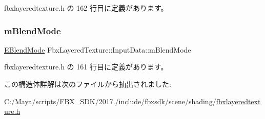  fbxlayeredtexture.\+h の 162 行目に定義があります。

\mbox{\label{struct_fbx_layered_texture_1_1_input_data_abc788f95c5595020e3d8989ee3d02a2b}} 
\subsubsection{\texorpdfstring{m\+Blend\+Mode}{mBlendMode}}
{\footnotesize\ttfamily \hyperlink{class_fbx_layered_texture_af291d42b0329513909d2ddf48f56f5ba}{E\+Blend\+Mode} Fbx\+Layered\+Texture\+::\+Input\+Data\+::m\+Blend\+Mode}



 fbxlayeredtexture.\+h の 161 行目に定義があります。



この構造体詳解は次のファイルから抽出されました\+:\begin{DoxyCompactItemize}
\item 
C\+:/\+Maya/scripts/\+F\+B\+X\+\_\+\+S\+D\+K/2017./include/fbxsdk/scene/shading/\hyperlink{fbxlayeredtexture_8h}{fbxlayeredtexture.\+h}\end{DoxyCompactItemize}
